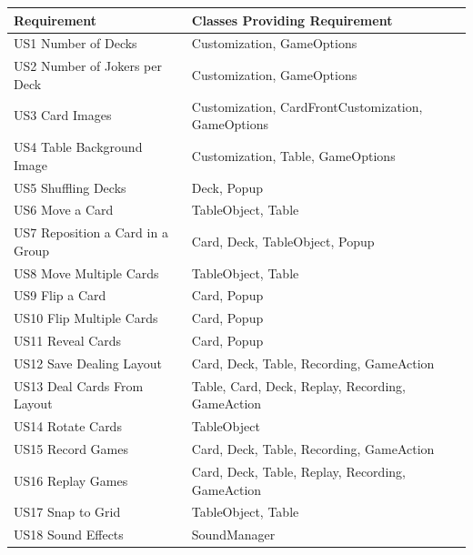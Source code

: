 \documentclass[a4paper]{project}
\begin{document}
			{
				\centering
				\begin{tabular}{|l|l|}
					\hline
					\textbf{Requirement}             & \textbf{Classes Providing Requirement}             \\ \hline
					US1 Number of Decks              & Customization, GameOptions                         \\ \hline
					US2 Number of Jokers per Deck    & Customization, GameOptions                         \\ \hline
					US3 Card Images                  & Customization, CardFrontCustomization, GameOptions \\ \hline
					US4 Table Background Image       & Customization, Table, GameOptions                  \\ \hline
					US5 Shuffling Decks              & Deck, Popup                                        \\ \hline
					US6 Move a Card                  & TableObject, Table                                 \\ \hline
					US7 Reposition a Card in a Group & Card, Deck, TableObject, Popup                     \\ \hline
					US8 Move Multiple Cards          & TableObject, Table                                 \\ \hline
					US9 Flip a Card                  & Card, Popup                                        \\ \hline
					US10 Flip Multiple Cards         & Card, Popup                                        \\ \hline
					US11 Reveal Cards                & Card, Popup                                        \\ \hline
					US12 Save Dealing Layout         & Card, Deck, Table, Recording, GameAction           \\ \hline
					US13 Deal Cards From Layout      & Table, Card, Deck, Replay, Recording, GameAction   \\ \hline
					US14 Rotate Cards                & TableObject                                        \\ \hline
					US15 Record Games                & Card, Deck, Table, Recording, GameAction           \\ \hline
					US16 Replay Games                & Card, Deck, Table, Replay, Recording, GameAction   \\ \hline
					US17 Snap to Grid                & TableObject, Table                                 \\ \hline
					US18 Sound Effects               & SoundManager                                       \\ \hline
				\end{tabular} \par
			}
		
\end{document}
